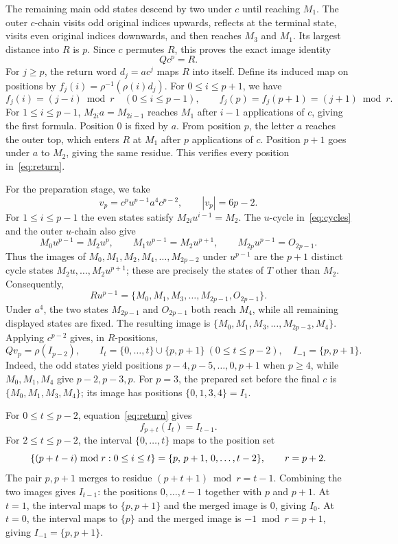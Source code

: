 \documentclass[11pt]{article}
\newcommand{\M}[1]{M_{#1}}
\newcommand{\Ost}[1]{O_{#1}}
\begin{document}
The remaining main odd states descend by two under $c$ until reaching $\M1$. The outer $c$-chain visits odd original indices upwards, reflects at the terminal state, visits even original indices downwards, and then reaches $\M3$ and $\M1$. Its largest distance into $R$ is $p$. Since $c$ permutes $R$, this proves the exact image identity
\begin{equation}\label{eq:core}
 Qc^p=R.
\end{equation}
For $j\geq p$, the return word $d_j=ac^j$ maps $R$ into itself. Define its induced map on positions by $f_j(i)=\rho^{-1}(\rho(i)d_j)$. For $0\leq i\leq p+1$, we have
\begin{equation}\label{eq:return}
 f_j(i)=(j-i)\bmod r\quad(0\leq i\leq p-1),\qquad
 f_j(p)=f_j(p+1)=(j+1)\bmod r.
\end{equation}
For $1\leq i\leq p-1$, $\M{2i}a=\M{2i-1}$ reaches $\M1$ after $i-1$ applications of $c$, giving the first formula. Position $0$ is fixed by $a$. From position $p$, the letter $a$ reaches the outer top, which enters $R$ at $\M1$ after $p$ applications of $c$. Position $p+1$ goes under $a$ to $\M2$, giving the same residue. This verifies every position in~\eqref{eq:return}.

For the preparation stage, we take
\[
 v_p=c^p u^{p-1}a^4c^{p-2},\qquad |v_p|=6p-2.
\]
For $1\leq i\leq p-1$ the even states satisfy $\M{2i}u^{i-1}=\M2$. The $u$-cycle in~\eqref{eq:cycles} and the outer $u$-chain also give
\[
 \M0u^{p-1}=\M2u^p,\qquad
 \M1u^{p-1}=\M2u^{p+1},\qquad
 \M{2p}u^{p-1}=\Ost{2p-1}.
\]
Thus the images of $\M0,\M1,\M2,\M4,\ldots,\M{2p-2}$ under $u^{p-1}$ are the $p+1$ distinct cycle states $\M2u,\ldots,\M2u^{p+1}$; these are precisely the states of $T$ other than $\M2$. Consequently,
\[
 Ru^{p-1}=\{\M0,\M1,\M3,\ldots,\M{2p-1},\Ost{2p-1}\}.
\]
Under $a^4$, the two states $\M{2p-1}$ and $\Ost{2p-1}$ both reach $\M4$, while all remaining displayed states are fixed. The resulting image is $\{\M0,\M1,\M3,\ldots,\M{2p-3},\M4\}$. Applying $c^{p-2}$ gives, in $R$-positions,
\begin{equation}\label{eq:prepare}
 Qv_p=\rho(I_{p-2}),\qquad I_t=\{0,\ldots,t\}\cup\{p,p+1\}\ (0\leq t\leq p-2),\quad I_{-1}=\{p,p+1\}.
\end{equation}
Indeed, the odd states yield positions $p-4,p-5,\ldots,0,p+1$ when $p\geq4$, while $\M0,\M1,\M4$ give $p-2,p-3,p$. For $p=3$, the prepared set before the final $c$ is $\{\M0,\M1,\M3,\M4\}$; its image has positions $\{0,1,3,4\}=I_1$. 

For $0\leq t\leq p-2$, equation~\eqref{eq:return} gives
\begin{equation}\label{eq:shrink}
 f_{p+t}(I_t)=I_{t-1}.
\end{equation}
For $2\leq t\leq p-2$, the interval $\{0,\ldots,t\}$ maps to the position set
\[
 \{(p+t-i)\bmod r:0\leq i\leq t\}
 =\{p,\,\nobreak p+1,\,0,\ldots,t-2\},\qquad r=p+2.
\] The pair $p,p+1$ merges to residue $(p+t+1)\bmod r=t-1$. Combining the two images gives $I_{t-1}$: the positions $0,\ldots,t-1$ together with $p$ and $p+1$. At $t=1$, the interval maps to $\{p,p+1\}$ and the merged image is $0$, giving $I_0$. At $t=0$, the interval maps to $\{p\}$ and the merged image is $-1\bmod r=p+1$, giving $I_{-1}=\{p,p+1\}$. 
\end{document}
